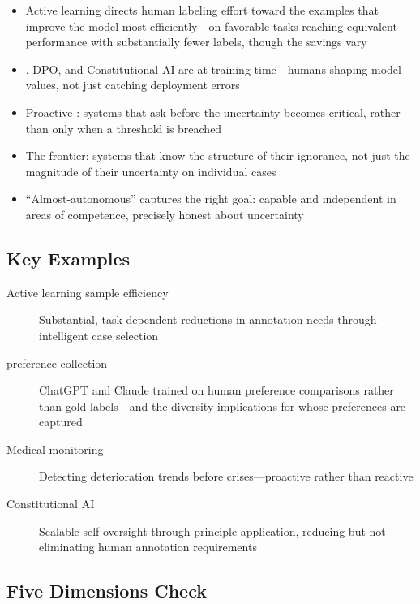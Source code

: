\begin{keyconcept}
\begin{itemize}
  \item Active learning directs human labeling effort toward the examples that improve the model most efficiently---on favorable tasks reaching equivalent performance with substantially fewer labels, though the savings vary
  \item \rlhf, DPO, and Constitutional AI are \hitl at training time---humans shaping model values, not just catching deployment errors
  \item Proactive \hitl: systems that ask before the uncertainty becomes critical, rather than only when a threshold is breached
  \item The frontier: \ai systems that know the structure of their ignorance, not just the magnitude of their uncertainty on individual cases
  \item ``Almost-autonomous'' captures the right goal: capable and independent in areas of competence, precisely honest about uncertainty
\end{itemize}
\end{keyconcept}

\subsection*{Key Examples}

\begin{description}
  \item[Active learning sample efficiency] Substantial, task-dependent reductions in annotation needs through intelligent case selection
  \item[\rlhf preference collection] ChatGPT and Claude trained on human preference comparisons rather than gold labels---and the diversity implications for whose preferences are captured
  \item[Medical monitoring] Detecting deterioration trends before crises---proactive rather than reactive \hitl
  \item[Constitutional AI] Scalable self-oversight through principle application, reducing but not eliminating human annotation requirements
\end{description}

\subsection*{Five Dimensions Check}

